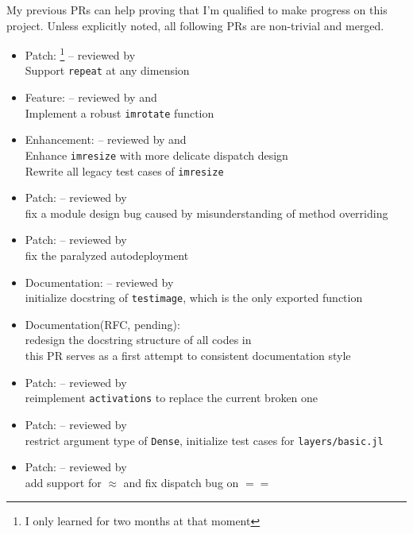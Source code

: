 My previous PRs can help proving that I'm qualified to make progress on this project. Unless explicitly noted, all following PRs are non-trivial and merged.
\begin{itemize}
    \item Patch: \footnote{I only learned \langjulia{} for two months at that moment}  {\small -- reviewed by \mbauman}\\
      {\small
      Support \texttt{repeat} at any dimension
      }
    \item Feature:  {\small -- reviewed by \evizero and \timholy}\\
      {\small
      Implement a robust \texttt{imrotate} function
      }
    \item Enhancement:  {\small -- reviewed by \evizero and \timholy}\\
      {\small
      Enhance \texttt{imresize} with more delicate dispatch design\\
      Rewrite all legacy test cases of \texttt{imresize}
      }
    \item Patch:  {\small -- reviewed by \julio}\\
      {\small
      fix a module design bug caused by misunderstanding of method overriding
      }
    \item Patch:  {\small -- reviewed by \evizero}\\
      {\small
      fix the paralyzed autodeployment
      }
    \item Documentation:  {\small -- reviewed by \timholy}\\
      {\small
      initialize docstring of \texttt{testimage}, which is the only exported function
      }
    \item Documentation(RFC, pending): \\
      {\small
      redesign the docstring structure of all codes in \imagebinarization\\
      this PR serves as a first attempt to consistent documentation style
      }
    \item Patch:  {\small -- reviewed by \mikeinnes}\\
      {\small
      reimplement \texttt{activations} to replace the current broken one
      }
    \item Patch:  {\small -- reviewed by \mikeinnes}\\
      {\small
      restrict argument type of \texttt{Dense}, initialize test cases for \texttt{layers/basic.jl}
      }
    \item Patch:  {\small -- reviewed by \mikeinnes}\\
      {\small
      add support for \textsf{$\approx$} and fix dispatch bug on \textsf{$==$}
      }
\end{itemize}
